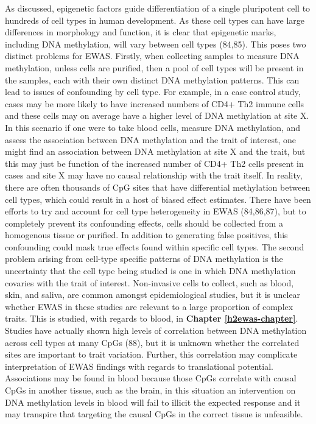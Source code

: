 \documentclass[11pt,oneside]{bristolthesis}
\begin{document}
As discussed, epigenetic factors guide differentiation of a single pluripotent cell to hundreds of cell types in human development. As these cell types can have large differences in morphology and function, it is clear that epigenetic marks, including DNA methylation, will vary between cell types (84,85). This poses two distinct problems for EWAS. Firstly, when collecting samples to measure DNA methylation, unless cells are purified, then a pool of cell types will be present in the samples, each with their own distinct DNA methylation patterns. This can lead to issues of confounding by cell type. For example, in a case control study, cases may be more likely to have increased numbers of CD4+ Th2 immune cells and these cells may on average have a higher level of DNA methylation at site X. In this scenario if one were to take blood cells, measure DNA methylation, and assess the association between DNA methylation and the trait of interest, one might find an association between DNA methylation at site X and the trait, but this may just be function of the increased number of CD4+ Th2 cells present in cases and site X may have no causal relationship with the trait itself. In reality, there are often thousands of CpG sites that have differential methylation between cell types, which could result in a host of biased effect estimates. There have been efforts to try and account for cell type heterogeneity in EWAS (84,86,87), but to completely prevent its confounding effects, cells should be collected from a homogenous tissue or purified. In addition to generating false positives, this confounding could mask true effects found within specific cell types. The second problem arising from cell-type specific patterns of DNA methylation is the uncertainty that the cell type being studied is one in which DNA methylation covaries with the trait of interest. Non-invasive cells to collect, such as blood, skin, and saliva, are common amongst epidemiological studies, but it is unclear whether EWAS in these studies are relevant to a large proportion of complex traits. This is studied, with regards to blood, in \textbf{Chapter \ref{h2ewas-chapter}}. Studies have actually shown high levels of correlation between DNA methylation across cell types at many CpGs (88), but it is unknown whether the correlated sites are important to trait variation. Further, this correlation may complicate interpretation of EWAS findings with regards to translational potential. Associations may be found in blood because those CpGs correlate with causal CpGs in another tissue, such as the brain, in this situation an intervention on DNA methylation levels in blood will fail to illicit the expected response and it may transpire that targeting the causal CpGs in the correct tissue is unfeasible.
\end{document}
